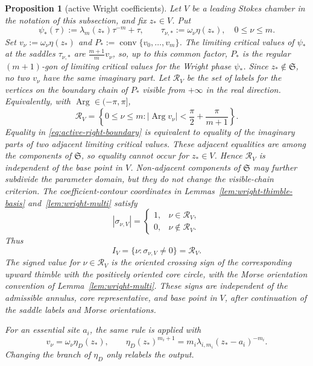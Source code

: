 \documentclass[reqno]{article}
\newtheorem{prop}[theorem]{Proposition}
\theoremstyle{definition}
\theoremstyle{remark}
\theoremstyle{plain}
\begin{document}
\begin{prop}[active Wright coefficients]\label{prop:active-wright-coefficients}
Let $V$ be a leading Stokes chamber in the notation of this subsection, and fix $z_\ast\in V$. Put
\[
\psi_\ast(\tau):=\lambda_m(z_\ast)\tau^{-m}+\tau,
\qquad
\tau_{\nu,\ast}:=\omega_\nu\eta(z_\ast),\quad 0\le\nu\le m.
\]
Set $v_\nu:=\omega_\nu\eta(z_\ast)$ and $P_\ast:=\operatorname{conv}\{v_0,\ldots,v_m\}$. The limiting critical values of $\psi_\ast$ at the saddles $\tau_{\nu,\ast}$ are $\frac{m+1}{m}v_\nu$, so, up to this common factor, $P_\ast$ is the regular $(m+1)$-gon of limiting critical values for the Wright phase $\psi_\ast$. Since $z_\ast\notin\mathfrak S$, no two $v_\nu$ have the same imaginary part. Let $\mathcal R_V$ be the set of labels for the vertices on the boundary chain of $P_\ast$ visible from $+\infty$ in the real direction. Equivalently, with $\operatorname{Arg}\in(-\pi,\pi]$,
\begin{equation}\label{eq:active-right-boundary}
\mathcal R_V=
\left\{0\le\nu\le m:
\left|\operatorname{Arg} v_\nu\right|<
\frac{\pi}{2}+\frac{\pi}{m+1}\right\}.
\end{equation}
Equality in \eqref{eq:active-right-boundary} is equivalent to equality of the imaginary parts of two adjacent limiting critical values. These adjacent equalities are among the components of \(\mathfrak S\), so equality cannot occur for \(z_\ast\in V\). Hence \(\mathcal R_V\) is independent of the base point in \(V\). Non-adjacent components of \(\mathfrak S\) may further subdivide the parameter domain, but they do not change the visible-chain criterion. The coefficient-contour coordinates in Lemmas~\ref{lem:wright-thimble-basis} and~\ref{lem:wright-multi} satisfy
\[
|\sigma_{\nu,V}|=
\begin{cases}
1, & \nu\in\mathcal R_V,\\
0, & \nu\notin\mathcal R_V.
\end{cases}
\]
Thus
\[
I_V=\{\nu:\sigma_{\nu,V}\ne0\}=\mathcal R_V.
\]
The signed value for $\nu\in\mathcal R_V$ is the oriented crossing sign of the corresponding upward thimble with the positively oriented core circle, with the Morse orientation convention of Lemma~\ref{lem:wright-multi}. These signs are independent of the admissible annulus, core representative, and base point in $V$, after continuation of the saddle labels and Morse orientations.

For an essential site $a_i$, the same rule is applied with
\[
v_\nu=\omega_\nu\eta_D(z_\ast),
\qquad
\eta_D(z_\ast)^{m_i+1}=m_i\lambda_{i,m_i}(z_\ast-a_i)^{-m_i}.
\]
Changing the branch of $\eta_D$ only relabels the output.
\end{prop}
\end{document}
